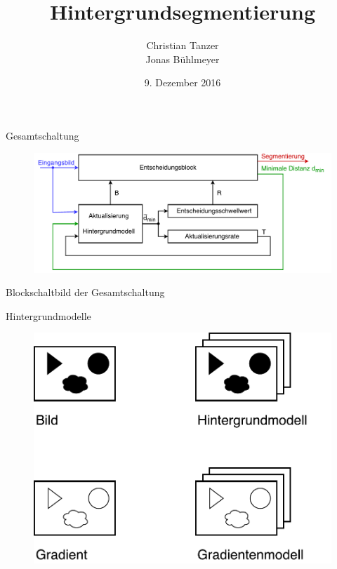 \documentclass[hyperref={pdfpagelabels=false}]{beamer}
\title{Hintergrundsegmentierung}
\author{Christian Tanzer\\Jonas Bühlmeyer}
\date{9. Dezember 2016}
\begin{document}
\begin{frame}
	\maketitle
\end{frame}

\setcounter{framenumber}{0}

\begin{frame}{Gesamtschaltung}
	\begin{figure}
		\centering
		\includegraphics[width=\linewidth]{./Bilder/PDF/PBAS_Blockdiagramm.pdf}
	\end{figure}
	\begin{center}
		Blockschaltbild der Gesamtschaltung
	\end{center}
\end{frame}

\begin{frame}{Hintergrundmodelle}
	\begin{figure}
		\centering
		\includegraphics[width=.8\linewidth]{./Bilder/PDF/arrays.pdf}
	\end{figure}	
\end{frame}
\end{document}
